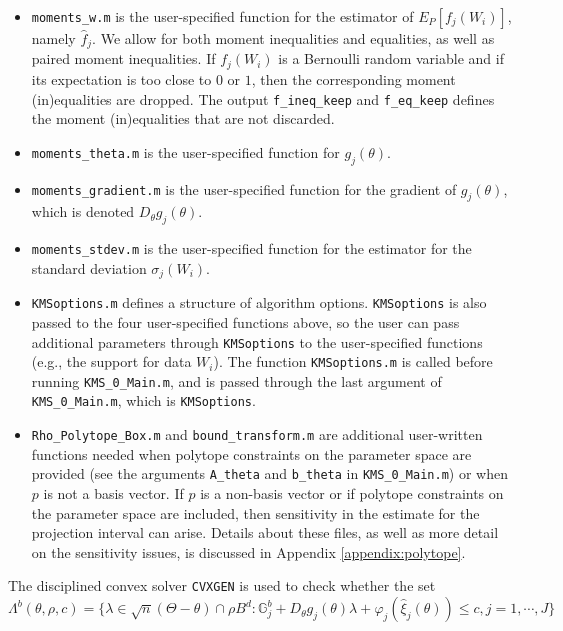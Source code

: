 \documentclass[12pt]{article}
\def\code#1{\texttt{#1}}
\begin{document}
\begin{itemize}
\item \code{moments\_w.m} is the user-specified function for the estimator of $E_P[f_j(W_i)]$, namely $\hat f_{j}$. We allow for both moment inequalities and equalities, as well as paired moment inequalities.  If $f_j(W_i)$ is a Bernoulli random variable and if its expectation is too close to $0$ or $1$, then the corresponding moment (in)equalities are dropped.  The output \code{f\_ineq\_keep} and \code{f\_eq\_keep} defines the moment (in)equalities that are not discarded.

\item \code{moments\_theta.m} is the user-specified function for $g_j(\theta)$.

\item \code{moments\_gradient.m} is the user-specified function for the gradient of $g_j(\theta)$, which is denoted $D_{\theta}g_j(\theta)$.

\item \code{moments\_stdev.m} is the user-specified function for the estimator for the standard deviation $\sigma_j(W_i)$.

\item \code{KMSoptions.m} defines a structure of algorithm options.  \code{KMSoptions} is also passed to the four user-specified functions above, so the user can pass additional parameters through \code{KMSoptions} to the user-specified functions (e.g., the support for data $W_i$).  The function \code{KMSoptions.m} is called before running \code{KMS\_0\_Main.m}, and is passed through the last  argument of \code{KMS\_0\_Main.m}, which is \code{KMSoptions}.

\item \code{Rho\_Polytope\_Box.m} and \code{bound\_transform.m} are additional user-written functions needed when polytope constraints on the parameter space are provided (see  the arguments \code{A\_theta} and \code{b\_theta} in \code{KMS\_0\_Main.m}) or when $p$ is not a basis vector.  If $p$ is a non-basis vector or if polytope constraints on the parameter space are included, then sensitivity in the estimate for the projection interval can arise.  Details about these files, as well as more detail on the sensitivity issues, is discussed in Appendix \ref{appendix:polytope}.
\end{itemize}
The disciplined convex solver \code{CVXGEN}  is used to check whether the set
\[
\Lambda^b(\theta,\rho,c) = \{ \lambda \in \sqrt{n}(\Theta-\theta) \cap \rho B^d : \mathbb{G}^b_{j} +  D_{\theta}g_j(\theta)\lambda + \varphi_j(\hat \xi_{j}(\theta)) \leq c, j = 1,\cdots,J\}
\]
\end{document}
